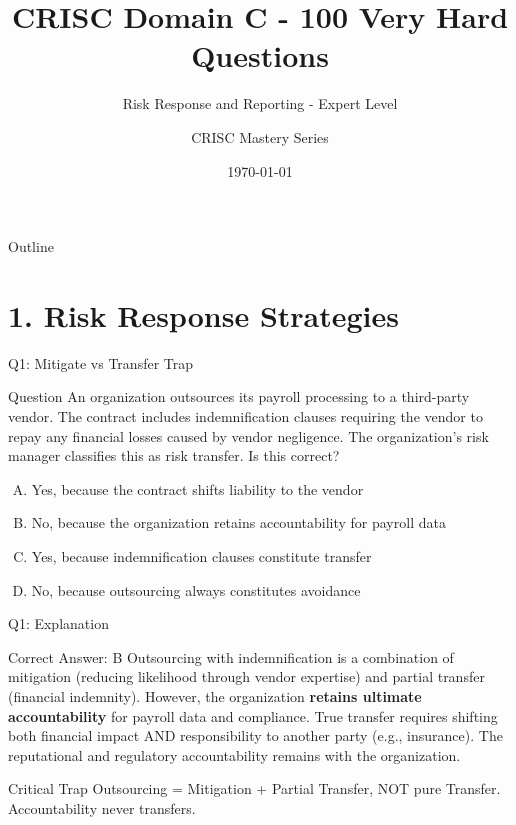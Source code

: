 \documentclass{beamer}
\title{CRISC Domain C - 100 Very Hard Questions}
\subtitle{Risk Response and Reporting - Expert Level}
\author{CRISC Mastery Series}
\date{\today}
\begin{document}
	
	\begin{frame}
		\titlepage
	\end{frame}
	
	\begin{frame}{Outline}
		\tableofcontents
	\end{frame}
	
	
	\section{1. Risk Response Strategies}
	
	\begin{frame}{Q1: Mitigate vs Transfer Trap}
		\begin{block}{Question}
			An organization outsources its payroll processing to a third-party vendor. The contract includes indemnification clauses requiring the vendor to repay any financial losses caused by vendor negligence. The organization's risk manager classifies this as risk transfer. Is this correct?
		\end{block}
		\begin{enumerate}[(A)]
			\item Yes, because the contract shifts liability to the vendor
			\item No, because the organization retains accountability for payroll data
			\item Yes, because indemnification clauses constitute transfer
			\item No, because outsourcing always constitutes avoidance
		\end{enumerate}
	\end{frame}
	
	\begin{frame}{Q1: Explanation}
		\begin{block}{Correct Answer: B}
			Outsourcing with indemnification is a combination of mitigation (reducing likelihood through vendor expertise) and partial transfer (financial indemnity). However, the organization \textbf{retains ultimate accountability} for payroll data and compliance. True transfer requires shifting both financial impact AND responsibility to another party (e.g., insurance). The reputational and regulatory accountability remains with the organization.
		\end{block}
		\begin{alertblock}{Critical Trap}
			Outsourcing = Mitigation + Partial Transfer, NOT pure Transfer. Accountability never transfers.
		\end{alertblock}
	\end{frame}
	
\end{document}
